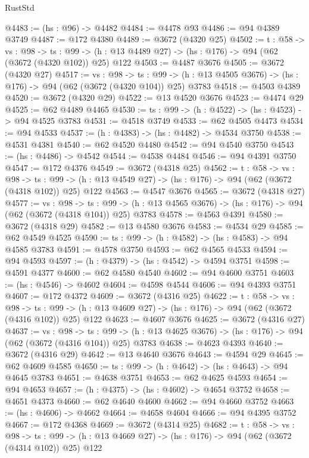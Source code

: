 \begin{lexlean}{RustStd}
\begin{coremodule}
{\begin{coremodule}
{{{{{{{{{@4483 := (hs : @96) -> @4482
@4484 := @4478 @93
@4486 := @94 @4389 @3749
@4487 := @172 @4380
@4489 := @3672 (@4320 @25)
@4502 := {t : @58} ->
  {vs : @98} ->
  {ts : @99} -> (h : @13 @4489 @27) -> (hs : @176) -> @94 (@62 (@3672 (@4320 @102)) @25) @122
@4503 := @4487 @3676
@4505 := @3672 (@4320 @27)
@4517 := {vs : @98} ->
  {ts : @99} -> (h : @13 @4505 @3676) -> (hs : @176) -> @94 (@62 (@3672 (@4320 @104)) @25) @3783
@4518 := @4503 @4389
@4520 := @3672 (@4320 @29)
@4522 := @13 @4520 @3676
@4523 := @4474 @29
@4525 := @62 @4489 @4465
@4530 := {ts : @99} -> (h : @4522) -> (hs : @4523) -> @94 @4525 @3783
@4531 := @4518 @3749
@4533 := @62 @4505 @4473
@4534 := @94 @4533
@4537 := (h : @4383) -> (hs : @4482) -> @4534 @3750
@4538 := @4531 @4381
@4540 := @62 @4520 @4480
@4542 := @94 @4540 @3750
@4543 := (hs : @4486) -> @4542
@4544 := @4538 @4484
@4546 := @94 @4391 @3750
@4547 := @172 @4376
@4549 := @3672 (@4318 @25)
@4562 := {t : @58} ->
  {vs : @98} ->
  {ts : @99} -> (h : @13 @4549 @27) -> (hs : @176) -> @94 (@62 (@3672 (@4318 @102)) @25) @122
@4563 := @4547 @3676
@4565 := @3672 (@4318 @27)
@4577 := {vs : @98} ->
  {ts : @99} -> (h : @13 @4565 @3676) -> (hs : @176) -> @94 (@62 (@3672 (@4318 @104)) @25) @3783
@4578 := @4563 @4391
@4580 := @3672 (@4318 @29)
@4582 := @13 @4580 @3676
@4583 := @4534 @29
@4585 := @62 @4549 @4525
@4590 := {ts : @99} -> (h : @4582) -> (hs : @4583) -> @94 @4585 @3783
@4591 := @4578 @3750
@4593 := @62 @4565 @4533
@4594 := @94 @4593
@4597 := (h : @4379) -> (hs : @4542) -> @4594 @3751
@4598 := @4591 @4377
@4600 := @62 @4580 @4540
@4602 := @94 @4600 @3751
@4603 := (hs : @4546) -> @4602
@4604 := @4598 @4544
@4606 := @94 @4393 @3751
@4607 := @172 @4372
@4609 := @3672 (@4316 @25)
@4622 := {t : @58} ->
  {vs : @98} ->
  {ts : @99} -> (h : @13 @4609 @27) -> (hs : @176) -> @94 (@62 (@3672 (@4316 @102)) @25) @122
@4623 := @4607 @3676
@4625 := @3672 (@4316 @27)
@4637 := {vs : @98} ->
  {ts : @99} -> (h : @13 @4625 @3676) -> (hs : @176) -> @94 (@62 (@3672 (@4316 @104)) @25) @3783
@4638 := @4623 @4393
@4640 := @3672 (@4316 @29)
@4642 := @13 @4640 @3676
@4643 := @4594 @29
@4645 := @62 @4609 @4585
@4650 := {ts : @99} -> (h : @4642) -> (hs : @4643) -> @94 @4645 @3783
@4651 := @4638 @3751
@4653 := @62 @4625 @4593
@4654 := @94 @4653
@4657 := (h : @4375) -> (hs : @4602) -> @4654 @3752
@4658 := @4651 @4373
@4660 := @62 @4640 @4600
@4662 := @94 @4660 @3752
@4663 := (hs : @4606) -> @4662
@4664 := @4658 @4604
@4666 := @94 @4395 @3752
@4667 := @172 @4368
@4669 := @3672 (@4314 @25)
@4682 := {t : @58} ->
  {vs : @98} ->
  {ts : @99} -> (h : @13 @4669 @27) -> (hs : @176) -> @94 (@62 (@3672 (@4314 @102)) @25) @122
}}}}}}}}}
\end{coremodule}}
\end{coremodule}
\end{lexlean}

